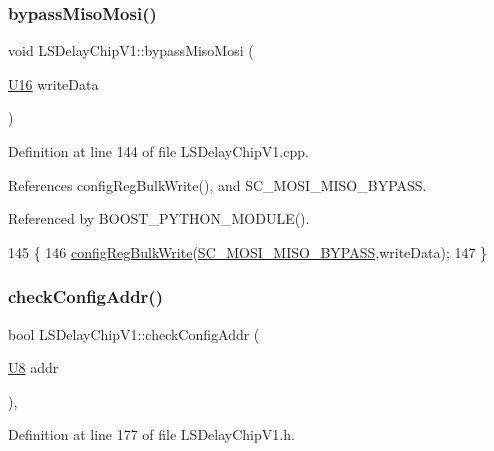 \subsubsection{\texorpdfstring{bypass\+Miso\+Mosi()}{bypassMisoMosi()}}
{\footnotesize\ttfamily void L\+S\+Delay\+Chip\+V1\+::bypass\+Miso\+Mosi (\begin{DoxyParamCaption}\item[{\hyperlink{ICECALv3_8h_adf928e51a60dba0df29d615401cc55a8}{U16}}]{write\+Data }\end{DoxyParamCaption})}



Definition at line 144 of file L\+S\+Delay\+Chip\+V1.\+cpp.



References config\+Reg\+Bulk\+Write(), and S\+C\+\_\+\+M\+O\+S\+I\+\_\+\+M\+I\+S\+O\+\_\+\+B\+Y\+P\+A\+SS.



Referenced by B\+O\+O\+S\+T\+\_\+\+P\+Y\+T\+H\+O\+N\+\_\+\+M\+O\+D\+U\+L\+E().


\begin{DoxyCode}
145 \{
146     \hyperlink{classLSDelayChipV1_afa626b5d52f8723bcaa3205d1cc7a0f8}{configRegBulkWrite}(\hyperlink{ICECALv3_8h_a2870f5a3cad23b2b4e7f16faefe8ef2e}{SC\_MOSI\_MISO\_BYPASS},writeData);
147 \}
\end{DoxyCode}
\mbox{\label{classLSDelayChipV1_aa8118972150a9e1e95e9006e003c0206}} 
\subsubsection{\texorpdfstring{check\+Config\+Addr()}{checkConfigAddr()}}
{\footnotesize\ttfamily bool L\+S\+Delay\+Chip\+V1\+::check\+Config\+Addr (\begin{DoxyParamCaption}\item[{\hyperlink{ICECALv3_8h_a3cb25ca6f51f003950f9625ff05536fc}{U8}}]{addr }\end{DoxyParamCaption})\hspace{0.3cm}{\ttfamily [inline]}, {\ttfamily [private]}}



Definition at line 177 of file L\+S\+Delay\+Chip\+V1.\+h.



